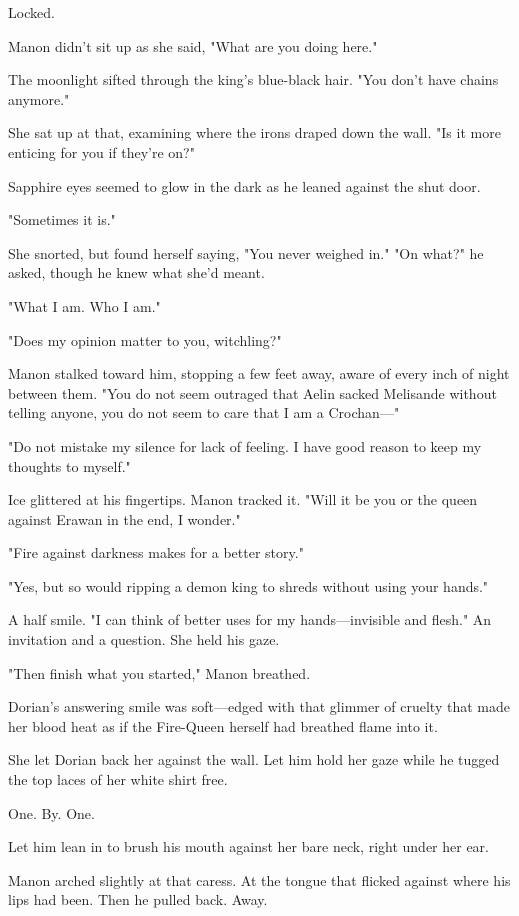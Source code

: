 Locked.

Manon didn't sit up as she said, "What are you doing here."

The moonlight sifted through the king's blue-black hair. "You don't have chains anymore."

She sat up at that, examining where the irons draped down the wall. "Is it more enticing for you if they're on?"

Sapphire eyes seemed to glow in the dark as he leaned against the shut door.

"Sometimes it is."

She snorted, but found herself saying, "You never weighed in." "On what?" he asked, though he knew what she'd meant.

"What I am. Who I am."

"Does my opinion matter to you, witchling?"

Manon stalked toward him, stopping a few feet away, aware of every inch of night between them. "You do not seem outraged that Aelin sacked Melisande without telling anyone, you do not seem to care that I am a Crochan---"

"Do not mistake my silence for lack of feeling. I have good reason to keep my thoughts to myself."

Ice glittered at his fingertips. Manon tracked it. "Will it be you or the queen against Erawan in the end, I wonder."

"Fire against darkness makes for a better story."

"Yes, but so would ripping a demon king to shreds without using your hands."

A half smile. "I can think of better uses for my hands---invisible and flesh." An invitation and a question. She held his gaze.

"Then finish what you started," Manon breathed.

Dorian's answering smile was soft---edged with that glimmer of cruelty that made her blood heat as if the Fire-Queen herself had breathed flame into it.

She let Dorian back her against the wall. Let him hold her gaze while he tugged the top laces of her white shirt free.

One. By. One.

Let him lean in to brush his mouth against her bare neck, right under her ear.

Manon arched slightly at that caress. At the tongue that flicked against where his lips had been. Then he pulled back. Away.

